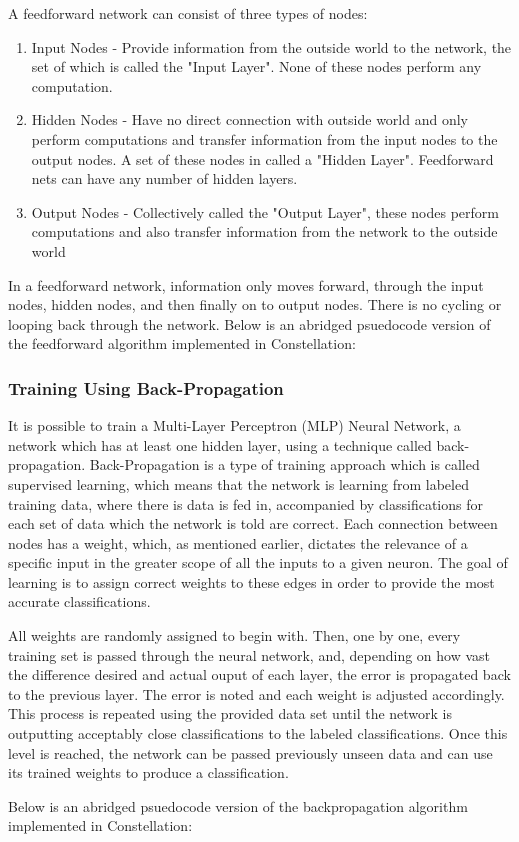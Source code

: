 A feedforward network can consist of three types of nodes:
\begin{enumerate}
    \item Input Nodes - Provide information from the outside world to the network, the set of which is called the "Input Layer". None of these nodes perform any computation.
    \item Hidden Nodes - Have no direct connection with outside world and only perform computations and transfer information from the input nodes to the output nodes. A set of these nodes in called a "Hidden Layer". Feedforward nets can have any number of hidden layers.
    \item Output Nodes - Collectively called the "Output Layer", these nodes perform computations and also transfer information from the network to the outside world
\end{enumerate}

In a feedforward network, information only moves forward, through the input nodes, hidden nodes, and then finally on to output nodes. There is no cycling or looping back through the network. Below is an abridged psuedocode version of the feedforward algorithm implemented in Constellation:
%

\subsubsection{Training Using Back-Propagation}
It is possible to train a Multi-Layer Perceptron (MLP) Neural Network, a network which has at least one hidden layer, using a technique called back-propagation. Back-Propagation is a type of training approach which is called supervised learning, which means that the network is learning from labeled training data, where there is data is fed in, accompanied by classifications for each set of data which the network is told are correct. Each connection between nodes has a weight, which, as mentioned earlier, dictates the relevance of a specific input in the greater scope of all the inputs to a given neuron. The goal of learning is to assign correct weights to these edges in order to provide the most accurate classifications.

All weights are randomly assigned to begin with. Then, one by one, every training set is passed through the neural network, and, depending on how vast the difference desired and actual ouput of each layer, the error is propagated back to the previous layer. The error is noted and each weight is adjusted accordingly. This process is repeated using the provided data set until the network is outputting acceptably close classifications to the labeled classifications. Once this level is reached, the network can be passed previously unseen data and can use its trained weights to produce a classification. 

Below is an abridged psuedocode version of the backpropagation algorithm implemented in Constellation:
%